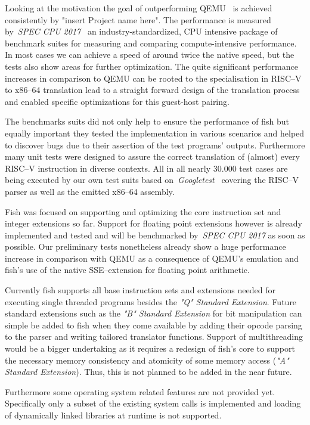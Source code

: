 Looking at the motivation the goal of outperforming QEMU~\cite{bellard2005qemu} is achieved consistently by "insert Project name here".
The performance is measured by~\textit{SPEC CPU 2017}~\cite{spec-cpu-2017} an industry-standardized, CPU intensive package of benchmark suites for measuring and comparing compute-intensive performance.
In most cases we can achieve a speed of around twice the native speed, but the tests also show areas for further optimization.
The quite significant performance increases in comparison to QEMU can be rooted to the specialisation in RISC--V to x86--64 translation lead to a straight forward design of the translation process and enabled specific optimizations for this guest-host pairing.

The benchmarks suits did not only help to ensure the performance of fish but equally important they tested the implementation in various scenarios and helped to discover bugs due to their assertion of the test programs' outputs.
Furthermore many unit tests were designed to assure the correct translation of (almost) every RISC--V instruction in diverse contexts.
All in all nearly 30.000 test cases are being executed by our own test suits based on~\textit{Googletest}~\cite{gtest} covering the RISC--V parser as well as the emitted x86--64 assembly.

Fish was focused on supporting and optimizing the core instruction set and integer extensions so far.
Support for floating point extensions however is already implemented and tested and will be benchmarked by~\textit{SPEC CPU 2017} as soon as possible.
Our preliminary tests nonetheless already show a huge performance increase in comparison with QEMU as a consequence of QEMU's emulation and fish's use of the native SSE--extension for floating point arithmetic.


Currently fish supports all base instruction sets and extensions needed for executing single threaded programs besides the \textit{"Q" Standard Extension}.
Future standard extensions such as the \textit{"B" Standard Extension} for bit manipulation can simple be added to fish when they come available by adding their opcode parsing to the parser and writing tailored translator functions.
Support of multithreading would be a bigger undertaking as it requires a redesign of fish's core to support the necessary memory consistency and atomicity of some memory access (\textit{"A" Standard Extension}).
Thus, this is not planned to be added in the near future.

Furthermore some operating system related features are not provided yet.
Specifically only a subset of the existing system calls is implemented and loading of dynamically linked libraries at runtime is not supported.

